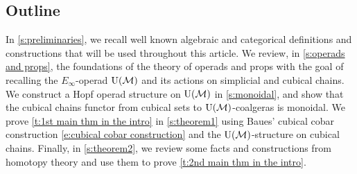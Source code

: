 \subsection*{Outline}

In \cref{s:preliminaries}, we recall well known algebraic and categorical definitions and constructions that will be used throughout this article.
We review, in \cref{s:operads and props}, the foundations of the theory of operads and props with the goal of recalling the $E_{\infty}$-operad ${\operatorname{U}(\mathcal{M})}$ and its actions on simplicial and cubical chains.
We construct a Hopf operad structure on ${\operatorname{U}(\mathcal{M})}$ in \cref{s:monoidal}, and show that the cubical chains functor from cubical sets to ${\operatorname{U}(\mathcal{M})}$-coalgeras is monoidal.
We prove \cref{t:1st main thm in the intro} in \cref{s:theorem1} using Baues' cubical cobar construction \eqref{e:cubical cobar construction} and the ${\operatorname{U}(\mathcal{M})}$-structure on cubical chains.
Finally, in \cref{s:theorem2}, we review some facts and constructions from homotopy theory and use them to prove \cref{t:2nd main thm in the intro}.